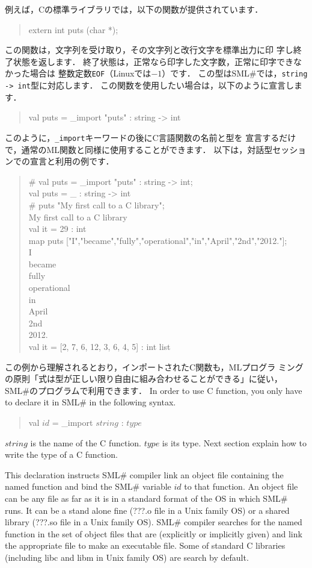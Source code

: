 \documentclass{jbook}
\newcommand{\smlsharp}{SML\#}
\newenvironment{program}{\begin{tt}\begin{quote}}{\end{quote}\end{tt}}
\begin{document}
	例えば，Cの標準ライブラリでは，以下の関数が提供されています．
\begin{program}
extern int puts (char *);
\end{program}
	この関数は，文字列を受け取り，その文字列と改行文字を標準出力に印
字し終了状態を返します．
	終了状態は，正常なら印字した文字数，正常に印字できなかった場合は
整数定数{\tt EOF}（Linuxでは$-1$）です．
	この型は\smlsharp{}では，{\tt string -> int}型に対応します．
	この関数を使用したい場合は，以下のように宣言します．
\begin{program}
val puts = \_import "puts" : string -> int
\end{program}
	このように，{\tt \_import}キーワードの後にC言語関数の名前と型を
宣言するだけで，通常のML関数と同様に使用することができます．
	以下は，対話型セッションでの宣言と利用の例です．
\begin{program}
\# val puts = \_import "puts" : string -> int;\\
val puts = \_ : string -> int\\
\# puts "My first call to a C library";\\
My first call to a C library\\
val it = 29 : int\\
map puts  ["I","became","fully","operational","in","April","2nd","2012."];\\
I\\
became\\
fully\\
operational\\
in\\
April\\
2nd\\
2012.\\
val it = [2, 7, 6, 12, 3, 6, 4, 5] : int list
\end{program}
	この例から理解されるとおり，インポートされたC関数も，MLプログラ
ミングの原則「式は型が正しい限り自由に組み合わせることができる」に従い，
\smlsharp{}のプログラムで利用できます．
\else%
	In order to use C function, you only have to declare it in
\smlsharp{} in the following syntax.
\begin{program}
val $id$ = \_import $string$ : $type$
\end{program}
	$string$ is the name of the C function.
	$type$ is its type.
	Next section explain how to write the type of a C function.

	This declaration instructs \smlsharp{} compiler link an
object file containing the named function and  bind the \smlsharp{}
variable $id$ to that function.
	An object file can be any file as far as it is in a standard
format of the OS in which \smlsharp{} runs.
	It can be a stand alone fine (???.o file in a Unix family OS)
or a shared library (???.so file in a Unix family OS).
	\smlsharp{} compiler searches for the named function in the set
of object files that are (explicitly or implicitly given) and link the
appropriate file to make an executable file.
	Some of standard C libraries (including libc and libm in Unix
family OS) are search by default.
\end{document}
